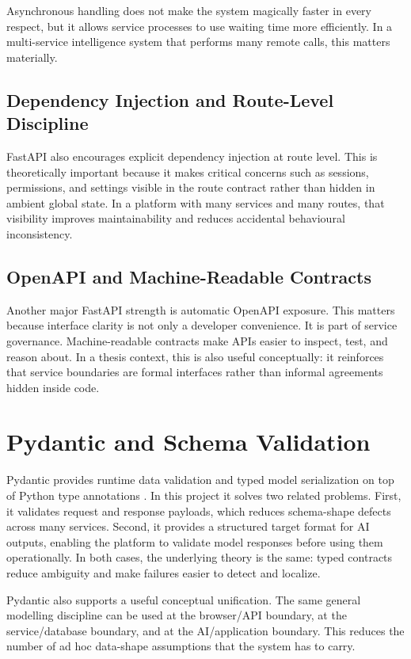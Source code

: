 Asynchronous handling does not make the system magically faster in every respect, but it allows service processes to use waiting time more efficiently. In a multi-service intelligence system that performs many remote calls, this matters materially.

\subsection{Dependency Injection and Route-Level Discipline}
FastAPI also encourages explicit dependency injection at route level. This is theoretically important because it makes critical concerns such as sessions, permissions, and settings visible in the route contract rather than hidden in ambient global state. In a platform with many services and many routes, that visibility improves maintainability and reduces accidental behavioural inconsistency.

\subsection{OpenAPI and Machine-Readable Contracts}
Another major FastAPI strength is automatic OpenAPI exposure. This matters because interface clarity is not only a developer convenience. It is part of service governance. Machine-readable contracts make APIs easier to inspect, test, and reason about. In a thesis context, this is also useful conceptually: it reinforces that service boundaries are formal interfaces rather than informal agreements hidden inside code.

\section{Pydantic and Schema Validation}
Pydantic provides runtime data validation and typed model serialization on top of Python type annotations \cite{pydantic_docs}. In this project it solves two related problems. First, it validates request and response payloads, which reduces schema-shape defects across many services. Second, it provides a structured target format for AI outputs, enabling the platform to validate model responses before using them operationally. In both cases, the underlying theory is the same: typed contracts reduce ambiguity and make failures easier to detect and localize.

Pydantic also supports a useful conceptual unification. The same general modelling discipline can be used at the browser/API boundary, at the service/database boundary, and at the AI/application boundary. This reduces the number of ad hoc data-shape assumptions that the system has to carry.

